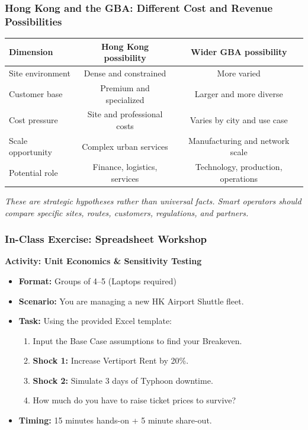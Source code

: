 \documentclass{beamer}
\begin{document}
\begin{frame}[t]
  \frametitle{Hong Kong and the GBA: Different Cost and Revenue Possibilities}
  \begin{center}
  \small
  \begin{tabular}{l|cc}
    \textbf{Dimension} & \textbf{Hong Kong possibility} & \textbf{Wider GBA possibility}\\
    \hline
    Site environment & Dense and constrained & More varied\\
    Customer base & Premium and specialized & Larger and more diverse\\
    Cost pressure & Site and professional costs & Varies by city and use case\\
    Scale opportunity & Complex urban services & Manufacturing and network scale\\
    Potential role & Finance, logistics, services & Technology, production, operations\\
  \end{tabular}
  \end{center}
  \vspace{0.35cm}
  \textit{These are strategic hypotheses rather than universal facts. Smart operators should compare specific sites, routes, customers, regulations, and partners.}
\end{frame}

\begin{frame}[t]
  \frametitle{In-Class Exercise: Spreadsheet Workshop}
  
  \textbf{Activity: Unit Economics \& Sensitivity Testing}
  \begin{itemize}
    \item \textbf{Format:} Groups of 4–5 (Laptops required)
    \item \textbf{Scenario:} You are managing a new HK Airport Shuttle fleet.
    \item \textbf{Task:} Using the provided Excel template:
    \begin{enumerate}
        \item Input the Base Case assumptions to find your Breakeven.
        \item \textbf{Shock 1:} Increase Vertiport Rent by 20\%.
        \item \textbf{Shock 2:} Simulate 3 days of Typhoon downtime.
        \item How much do you have to raise ticket prices to survive?
    \end{enumerate}
    \item \textbf{Timing:} 15 minutes hands-on + 5 minute share-out.
  \end{itemize}
\end{frame}
\end{document}
